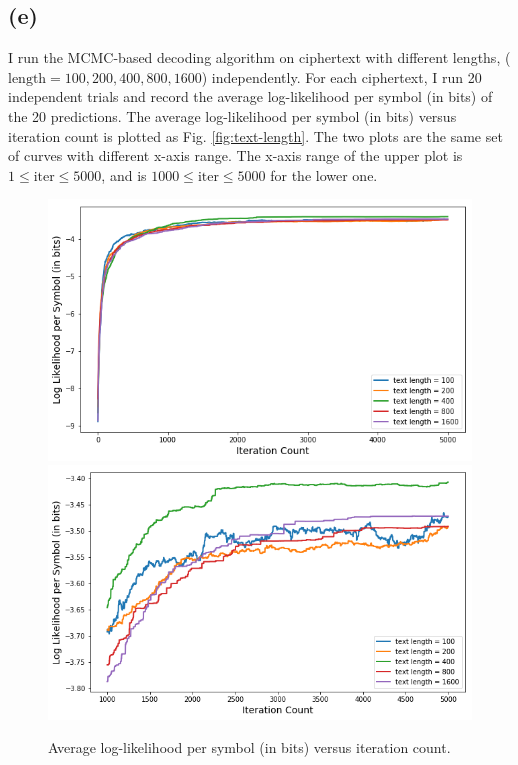 \documentclass[12pt,aps,pre,reprint]{revtex4-1}
\begin{document}
\subsection{(e)}
I run the MCMC-based decoding algorithm on ciphertext with different lengths, ($\text{length}= 100, 200, 400, 800, 1600$) independently. For each ciphertext, I run 20 independent trials and record the average log-likelihood per symbol (in bits) of the 20 predictions. The average log-likelihood per symbol (in bits) versus iteration count is plotted as Fig. \ref{fig:text-length}. The two plots are the same set of curves with different x-axis range. The x-axis range of the upper plot is $1\leq\text{iter}\leq5000$, and is $1000\leq\text{iter}\leq5000$ for the lower one. 
\begin{figure}[H]
	\centering
	\includegraphics[width=\linewidth]{pics/entropy-1.png}
	\includegraphics[width=\linewidth]{pics/entropy-2.png}
	\caption{Average log-likelihood per symbol (in bits) versus iteration count.}
	\label{fig:entropy}
\end{figure}
\end{document}
